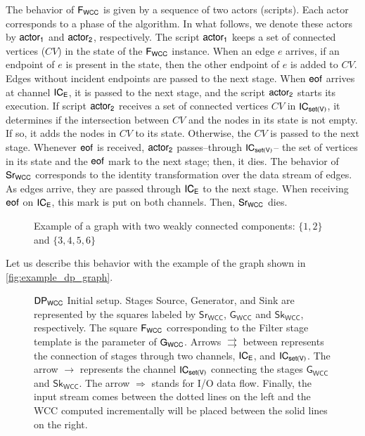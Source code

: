 The behavior of $\mathsf{F_{WCC}}$ is given by a sequence of two actors (scripts). Each actor corresponds to a phase of the algorithm. In what follows, we denote these actors by $\mathsf{actor_1}$ and $\mathsf{actor_2}$, respectively. 
The script $\mathsf{actor_1}$ keeps a set of connected vertices ($CV$) in the state of the $\mathsf{F_{WCC}}$ instance. When an edge $e$ arrives, if an endpoint of $e$ is present in the state, then the other endpoint of $e$ is added to $CV$. 
Edges without incident endpoints are passed to the next stage. When $\mathsf{eof}$ arrives at channel $\mathsf{IC_E}$, it is passed to the next stage, and the script $\mathsf{actor_2}$ starts its execution. 
If script $\mathsf{actor_2}$ receives a set of connected vertices $CV$ in $\mathsf{IC_{set(V)}}$, it determines if the intersection between $CV$ and the nodes in its state is not empty. If so, it adds the nodes in $CV$  to its state. 
Otherwise, the $CV$ is passed to the next stage. Whenever $\mathsf{eof}$ is received, $\mathsf{actor_2}$ passes--through $\mathsf{IC_{set(V)}}$-- the set of vertices in its state and the $\mathsf{eof}$ mark to the next stage; then, it dies.
The behavior of $\mathsf{Sr_{WCC}}$ corresponds to the identity transformation over the data stream of edges.  As edges arrive, they are passed through  $\mathsf{IC_E}$ to the next stage. When receiving $\mathsf{eof}$ on $\mathsf{IC_E}$, this mark is put on both channels. 
Then, $\mathsf{Sr_{WCC}}$ dies. 

\begin{figure}
 \begin{center}
\end{center}
\caption[{[PoC] Graph WCC Example}]{Example of a graph with two weakly connected components: $\{1,2\}$ and $\{3,4,5,6\}$}
\label{fig:example_dp_graph}
\end{figure}

Let us describe this behavior with the example of the graph shown in \autoref{fig:example_dp_graph}.

\begin{figure}[h!]
  \centering
{}
\caption[{[PoC] $\dpwcc$ Initial Setup}]{$\dpwcc$ Initial setup. Stages Source, Generator, and Sink are represented by the squares labeled by $\mathsf{Sr_{WCC}}$, $\mathsf{G_{WCC}}$ and $\mathsf{Sk_{WCC}}$, respectively.  The square $\mathsf{F_{WCC}}$ corresponding to the Filter stage template is the parameter of $\mathsf{G_{WCC}}$. Arrows $\rightrightarrows$ between represents the connection of stages through two channels, $\mathsf{IC_E}$, and $\mathsf{IC_{set(V)}}$. The arrow  $\rightarrow$ represents the channel $\mathsf{IC_{set(V)}}$ connecting the stages $\mathsf{G_{WCC}}$ and $\mathsf{Sk_{WCC}}$. The arrow $\Longrightarrow$ stands for I/O data flow. Finally, the input stream comes between the dotted lines on the left and the WCC computed incrementally will be placed between the solid lines on the right.}
\label{fig:dp_example_0}
\end{figure}

